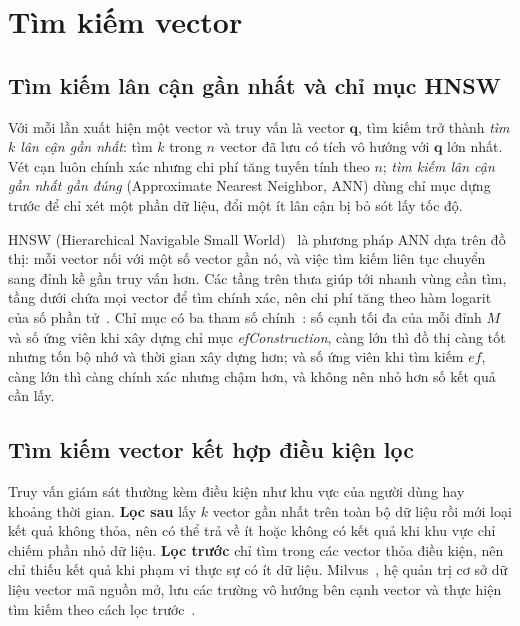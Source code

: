 \section{Tìm kiếm vector}
\label{sec:3.6}

\subsection{Tìm kiếm lân cận gần nhất và chỉ mục HNSW}
\label{sec:3.6.1}
\label{sec:3.6.2}

Với mỗi lần xuất hiện một vector và truy vấn là vector $\mathbf{q}$, tìm kiếm trở thành \emph{tìm $k$ lân cận gần nhất}: tìm $k$ trong $n$ vector đã lưu có tích vô hướng với $\mathbf{q}$ lớn nhất. Vét cạn luôn chính xác nhưng chi phí tăng tuyến tính theo $n$; \emph{tìm kiếm lân cận gần nhất gần đúng} (Approximate Nearest Neighbor, ANN) dùng chỉ mục dựng trước để chỉ xét một phần dữ liệu, đổi một ít lân cận bị bỏ sót lấy tốc độ.

HNSW (Hierarchical Navigable Small World)~\cite{malkov2020hnsw} là phương pháp ANN dựa trên đồ thị: mỗi vector nối với một số vector gần nó, và việc tìm kiếm liên tục chuyển sang đỉnh kề gần truy vấn hơn. Các tầng trên thưa giúp tới nhanh vùng cần tìm, tầng dưới chứa mọi vector để tìm chính xác, nên chi phí tăng theo hàm logarit của số phần tử~\cite{malkov2020hnsw}. Chỉ mục có ba tham số chính~\cite{milvus2026hnsw}: số cạnh tối đa của mỗi đỉnh $M$ và số ứng viên khi xây dựng chỉ mục \textit{ef\-Con\-struc\-tion}, càng lớn thì đồ thị càng tốt nhưng tốn bộ nhớ và thời gian xây dựng hơn; và số ứng viên khi tìm kiếm $\mathit{ef}$, càng lớn thì càng chính xác nhưng chậm hơn, và không nên nhỏ hơn số kết quả cần lấy.

\subsection{Tìm kiếm vector kết hợp điều kiện lọc}
\label{sec:3.6.3}

Truy vấn giám sát thường kèm điều kiện như khu vực của người dùng hay khoảng thời gian. \textbf{Lọc sau} lấy $k$ vector gần nhất trên toàn bộ dữ liệu rồi mới loại kết quả không thỏa, nên có thể trả về ít hoặc không có kết quả khi khu vực chỉ chiếm phần nhỏ dữ liệu. \textbf{Lọc trước} chỉ tìm trong các vector thỏa điều kiện, nên chỉ thiếu kết quả khi phạm vi thực sự có ít dữ liệu. Milvus~\cite{wang2021milvus}, hệ quản trị cơ sở dữ liệu vector mã nguồn mở, lưu các trường vô hướng bên cạnh vector và thực hiện tìm kiếm theo cách lọc trước~\cite{milvus2026filtered}.

